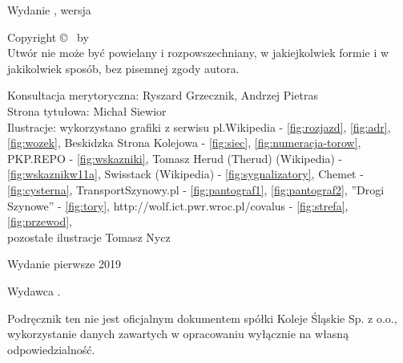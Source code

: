 
\clearpage

\begin{adjustwidth}{0.23\textwidth}{0.23\textwidth}
\begingroup
  \null\vfill
  \begin{center}
  \utitle\par
  Wydanie \uedition, wersja \urevision\par
  Copyright \copyright{} \udate\ by \uauthor\\
  Utwór nie może być powielany i rozpowszechniany, w jakiejkolwiek formie
  i w jakikolwiek sposób, bez pisemnej zgody autora.\par  
  

Konsultacja merytoryczna: Ryszard Grzecznik, Andrzej Pietras\\
Strona tytułowa: Michał Siewior\\
Ilustracje: wykorzystano grafiki z serwisu pl.Wikipedia - \ref{fig:rozjazd}, \ref{fig:adr}, \ref{fig:wozek}, Beskidzka Strona Kolejowa  - \ref{fig:siec}, \ref{fig:numeracja-torow}, PKP.REPO - \ref{fig:wskazniki}, Tomasz Herud (Therud) (Wikipedia) - \ref{fig:wskaznikw11a}, Swisstack (Wikipedia) - \ref{fig:sygnalizatory}, Chemet - \ref{fig:cysterna}, TransportSzynowy.pl - \ref{fig:pantograf1}, \ref{fig:pantograf2}, ''Drogi Szynowe'' - \ref{fig:tory}, http://wolf.ict.pwr.wroc.pl/covalus - \ref{fig:strefa}, \ref{fig:przewod}, 
\\pozostałe ilustracje Tomasz Nycz
\par
  
  Wydanie pierwsze 2019\par
  Wydawca \upublisher.\par
  Podręcznik ten nie jest oficjalnym dokumentem spółki Koleje Śląskie Sp. z o.o., wykorzystanie danych zawartych w opracowaniu wyłącznie na własną odpowiedzialność.\par

  \uwebsite
  \end{center}
  \vspace*{10mm}
\endgroup
\end{adjustwidth}

\clearpage